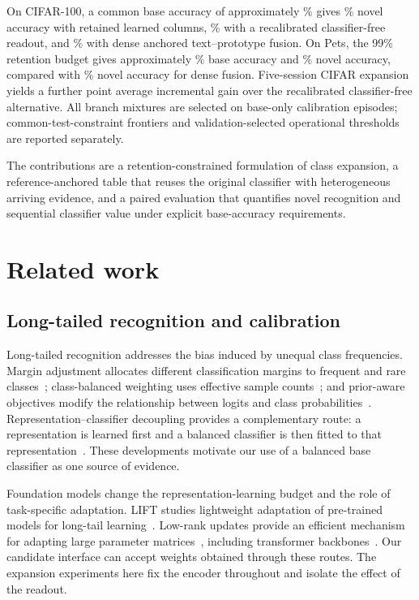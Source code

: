 \documentclass[research]{fcs}
\begin{document}
On CIFAR-100, a common base accuracy of approximately \CFMatchedBase\% gives \CFMatchedNovel\% novel accuracy with retained learned columns, \CFTunedNovel\% with a recalibrated classifier-free readout, and \CFDenseNovel\% with dense anchored text--prototype fusion. On Pets, the 99\% retention budget gives approximately \PetStrictBase\% base accuracy and \PetStrictNovel\% novel accuracy, compared with \PetStrictDenseNovel\% novel accuracy for dense fusion. Five-session CIFAR expansion yields a further \CFTunedAverageGain\-point average incremental gain over the recalibrated classifier-free alternative. All branch mixtures are selected on base-only calibration episodes; common-test-constraint frontiers and validation-selected operational thresholds are reported separately.

The contributions are a retention-constrained formulation of class expansion, a reference-anchored table that reuses the original classifier with heterogeneous arriving evidence, and a paired evaluation that quantifies novel recognition and sequential classifier value under explicit base-accuracy requirements.

\section{Related work}
\subsection{Long-tailed recognition and calibration}
Long-tailed recognition addresses the bias induced by unequal class frequencies. Margin adjustment allocates different classification margins to frequent and rare classes~\cite{cao2019ldam}; class-balanced weighting uses effective sample counts~\cite{cui2019classbalanced}; and prior-aware objectives modify the relationship between logits and class probabilities~\cite{ren2020bsm,menon2021logitadj}. Representation--classifier decoupling provides a complementary route: a representation is learned first and a balanced classifier is then fitted to that representation~\cite{kang2020decoupling}. These developments motivate our use of a balanced base classifier as one source of evidence.

Foundation models change the representation-learning budget and the role of task-specific adaptation. LIFT studies lightweight adaptation of pre-trained models for long-tail learning~\cite{shi2024lift}. Low-rank updates provide an efficient mechanism for adapting large parameter matrices~\cite{hu2022lora}, including transformer backbones~\cite{dosovitskiy2021vit}. Our candidate interface can accept weights obtained through these routes. The expansion experiments here fix the encoder throughout and isolate the effect of the readout.
\end{document}
